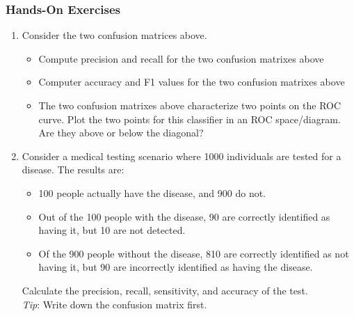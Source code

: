 \begin{tcolorbox}[colback=code]
\subsubsection*{Hands-On Exercises} 

\begin{enumerate}
  \item Consider the two confusion matrices above. 
  \begin{itemize}
     \item Compute precision and recall for the two confusion matrixes above
     \item Computer accuracy and F1 values for the two confusion matrixes above
     \item The two confusion matrixes above characterize two points on the ROC curve. Plot the two points for this classifier in an ROC space/diagram. Are they above or below the diagonal?
  \end{itemize}
  \vspace{.5\baselineskip}
  \item Consider a medical testing scenario where 1000 individuals are tested for a disease. The results are:
  \begin{itemize}
    \item 100 people actually have the disease, and 900 do not.
    \item Out of the 100 people with the disease, 90 are correctly identified as having it, but 10 are not detected.
    \item Of the 900 people without the disease, 810 are correctly identified as not having it, but 90 are incorrectly identified as having the disease.
  \end{itemize}
  Calculate the precision, recall, sensitivity, and accuracy of the test. \\
  \emph{Tip}: Write down the confusion matrix first.
\end{enumerate}
\end{tcolorbox}


